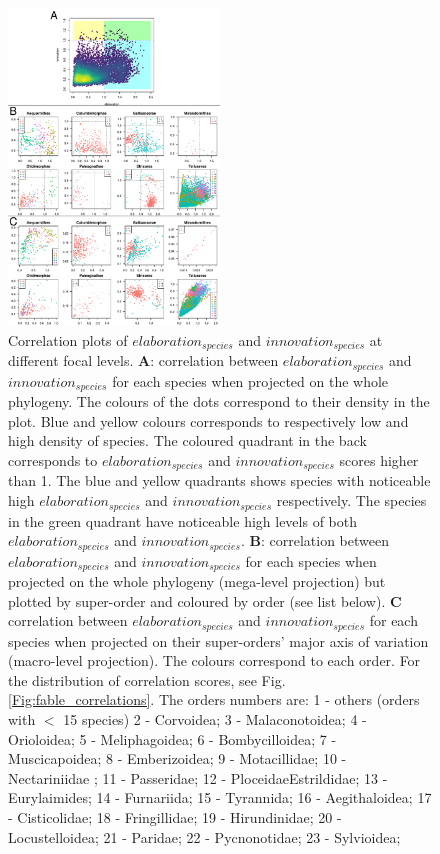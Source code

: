 \documentclass[12pt,letterpaper]{article}
\begin{document}
\begin{figure}[htpb]
\centering
\centering
   \includegraphics[width=0.5\textwidth]{Figures/correlations.pdf}
\caption{Correlation plots of $elaboration_{species}$ and $innovation_{species}$ at different focal levels. \textbf{A}: correlation between $elaboration_{species}$ and $innovation_{species}$ for each species when projected on the whole phylogeny. The colours of the dots correspond to their density in the plot. Blue and yellow colours corresponds to respectively low and high density of species. The coloured quadrant in the back corresponds to $elaboration_{species}$ and $innovation_{species}$ scores higher than 1. The blue and yellow quadrants shows species with noticeable high $elaboration_{species}$ and $innovation_{species}$ respectively. The species in the green quadrant have noticeable high levels of both $elaboration_{species}$ and $innovation_{species}$. \textbf{B}: correlation between $elaboration_{species}$ and $innovation_{species}$ for each species when projected on the whole phylogeny (mega-level projection) but plotted by super-order and coloured by order (see list below). \textbf{C} correlation between $elaboration_{species}$ and $innovation_{species}$ for each species when projected on their super-orders' major axis of variation (macro-level projection). The colours correspond to each order. For the distribution of correlation scores, see Fig. \ref{Fig:fable_correlations}. The orders numbers are:
1 - others (orders with $<$ 15 species)
2 - Corvoidea;
3 - Malaconotoidea;
4 - Orioloidea;
5 - Meliphagoidea;
6 - Bombycilloidea;
7 - Muscicapoidea;
8 - Emberizoidea;
9 - Motacillidae;
10 - Nectariniidae ;
11 - Passeridae;
12 - PloceidaeEstrildidae;
13 - Eurylaimides;
14 - Furnariida;
15 - Tyrannida;
16 - Aegithaloidea;
17 - Cisticolidae;
18 - Fringillidae;
19 - Hirundinidae;
20 - Locustelloidea;
21 - Paridae;
22 - Pycnonotidae;
23 - Sylvioidea;}
\label{Fig:figure_correlations}
\end{figure}
\end{document}
